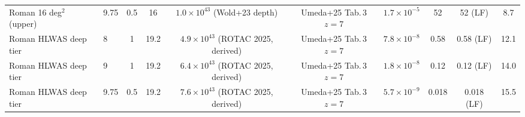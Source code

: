\begin{tabular}{llcccccccc}
Roman 16 deg$^2$ (upper) & 9.75 & 0.5 & 16 & $1.0\times10^{43}$ (Wold+23 depth) & Umeda+25 Tab.\,3 $z=7$ & $1.7\times10^{-5}$ & 52 & 52 (LF) & 8.7 \\
Roman HLWAS deep tier & 8 & 1 & 19.2 & $4.9\times10^{43}$ (ROTAC 2025, derived) & Umeda+25 Tab.\,3 $z=7$ & $7.8\times10^{-8}$ & 0.58 & 0.58 (LF) & 12.1 \\
Roman HLWAS deep tier & 9 & 1 & 19.2 & $6.4\times10^{43}$ (ROTAC 2025, derived) & Umeda+25 Tab.\,3 $z=7$ & $1.8\times10^{-8}$ & 0.12 & 0.12 (LF) & 14.0 \\
Roman HLWAS deep tier & 9.75 & 0.5 & 19.2 & $7.6\times10^{43}$ (ROTAC 2025, derived) & Umeda+25 Tab.\,3 $z=7$ & $5.7\times10^{-9}$ & 0.018 & 0.018 (LF) & 15.5 \\
\bottomrule
\end{tabular}
